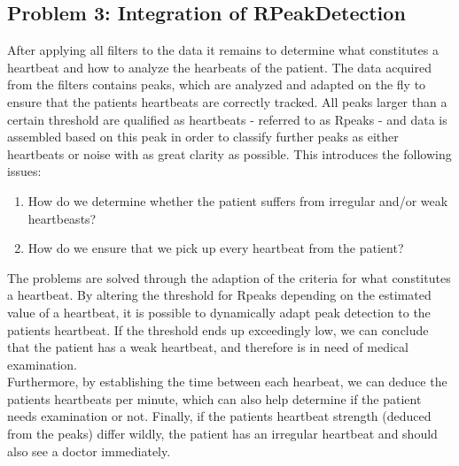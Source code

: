 \documentclass[12pt,a4paper]{article}
\begin{document}
\subsection{Problem 3: Integration of RPeakDetection}
After applying all filters to the data it remains to determine what constitutes a heartbeat and how to analyze the hearbeats of the patient. The data acquired from the filters contains peaks, which are analyzed and adapted on the fly to ensure that the patients heartbeats are correctly tracked. All peaks larger than a certain threshold are qualified as heartbeats - referred to as Rpeaks - and data is assembled based on this peak in order to classify further peaks as either heartbeats or noise with as great clarity as possible. This introduces the following issues:
\begin{enumerate}
\item How do we determine whether the patient suffers from irregular and/or weak heartbeasts?
\item How do we ensure that we pick up every heartbeat from the patient?
\end{enumerate}
The problems are solved through the adaption of the criteria for what constitutes a heartbeat. By altering the threshold for Rpeaks depending on the estimated value of a heartbeat, it is possible to dynamically adapt peak detection to the patients heartbeat. If the threshold ends up exceedingly low, we can conclude that the patient has a weak heartbeat, and therefore is in need of medical examination.\\
Furthermore, by establishing the time between each hearbeat, we can deduce the patients heartbeats per minute, which can also help determine if the patient needs examination or not. Finally, if the patients heartbeat strength (deduced from the peaks) differ wildly, the patient has an irregular heartbeat and should also see a doctor immediately.
\end{document}
